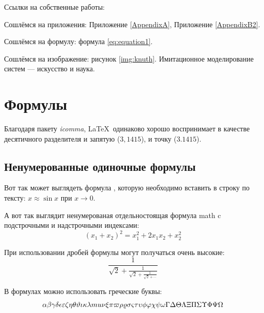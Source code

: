 

Ссылки  на собственные работы:~\cite{vakbib1, confbib1}

Сошлёмся на приложения: Приложение \ref{AppendixA}, Приложение \ref{AppendixB2}.

Сошлёмся на формулу: формула \eqref{eq:equation1}.

Сошлёмся на изображение: рисунок \ref{img:knuth}.
Имитационное моделирование систем --- искусство и наука. \cite{Shennon}


\section{Формулы} \label{sect1_3}

Благодаря пакету \textit{icomma}, \LaTeX~одинаково хорошо воспринимает в качестве десятичного разделителя и запятую ($3,1415$), и точку ($3.1415$).

\subsection{Ненумерованные одиночные формулы} \label{subsect1_3_1}

Вот так может выглядеть формула , которую необходимо вставить в строку по тексту: $x \approx \sin x$ при $x \to 0$.

А вот так выглядит ненумерованая отдельностоящая формула \Gls{math} c подстрочными и надстрочными индексами:
\[
(x_1+x_2)^2 = x_1^2 + 2 x_1 x_2 + x_2^2
\]

При использовании дробей формулы могут получаться очень высокие:
\[
  \frac{1}{\sqrt{2}+
  \displaystyle\frac{1}{\sqrt{2}+
  \displaystyle\frac{1}{\sqrt{2}+\cdots}}}
\]

В формулах можно использовать греческие буквы:
\[
\alpha\beta\gamma\delta\epsilon\varepsilon\zeta\eta\theta\vartheta\iota\kappa\lambda\\mu\nu\xi\pi\varpi\rho\varrho\sigma\varsigma\tau\upsilon\phi\varphi\chi\psi\omega\Gamma\Delta\Theta\Lambda\Xi\Pi\Sigma\Upsilon\Phi\Psi\Omega
\]

